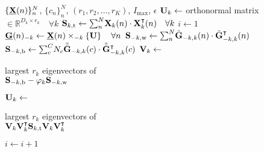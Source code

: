 \begin{algorithmic}[1]
  \Require $\{\ten{X}(n)\}_n^N$, $\{c_n\}_n^N$,
  $(r_1,r_2,\ldots,r_K)$, $I_\text{max}$, $\epsilon$
  \State $\mat{U}_k \gets $ orthonormal matrix $\in \mathbb{R}^{D_k\times r_k}
  \quad \forall k$
  \State $\mat{S}_{k,\text{t}} \gets
  \textstyle{\sum_n^N}\mat{X}_k(n)\cdot\mat{X}_k^\intercal(n)\quad \forall k$
  \State $i\gets 1$
  \Repeat
  \State $\ten{G}(n)_{-k} \gets \ten{X}(n)\mmprs{\mat{U}}{k} \quad \forall n$
  \State $\mat{S}_{-k,\text{w}} \gets
  \textstyle{\sum_n^N}\tilde{\mat{G}}_{-k,k}(n)\cdot\tilde{\mat{G}}_{-k,k}^\intercal(n)$
  \State $\mat{S}_{-k,\text{b}} \gets
  \textstyle{\sum_c^C}N_c\tilde{\bar{\mat{G}}}_{-k,k}(c)\cdot\tilde{\bar{\mat{G}}}_{-k,k}^\intercal(c)$
  \State $\mat{V}_k\gets$ \parbox[t]{5cm}{largest $r_k$ eigenvectors of \\
  $\mat{S}_{-k,\text{b}} - \varphi_k\mat{S}_{-k,\text{w}}$}
  \State $\mat{U}_k \gets$ \parbox[t]{5cm}{largest $r_k$ eigenvectors of \\
  $\mat{V}_k\mat{V}_k^\intercal\mat{S}_{k,\text{t}}\mat{V}_k\mat{V}_k^\intercal$}
  \EndFor
  \State $i\gets i+1$
\end{algorithmic}
